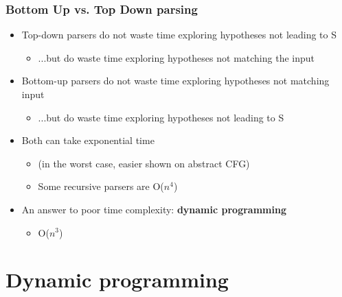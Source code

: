 \documentclass{beamer}
\begin{document}
\begin{frame}[fragile]
\frametitle{Bottom Up vs. Top Down parsing}

\begin{itemize}
\item Top-down parsers do not waste time exploring hypotheses not leading to S
\begin{itemize}
\item ...but do waste time exploring hypotheses not matching the input
\end{itemize}
\item Bottom-up parsers do not waste time exploring hypotheses not matching input
\begin{itemize}
\item ...but do waste time exploring hypotheses not leading to S
\end{itemize}
\item Both can take exponential time
\begin{itemize}
\item (in the worst case, easier shown on abstract CFG)
\item Some recursive parsers are O($n^4$)
\end{itemize}
\item An answer to poor time complexity: {\bf dynamic programming}
\begin{itemize}
\item O($n^3$)
\end{itemize}
\end{itemize}

\end{frame}



\section{Dynamic programming}

\end{document}
